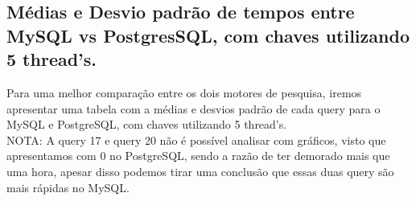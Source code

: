 \documentclass{article}
\begin{document}
  \subsection{Médias e Desvio padrão de tempos entre MySQL vs PostgresSQL, com chaves utilizando 5 thread's.}

  \texttt{}\par Para uma melhor comparação entre os dois motores de pesquisa, iremos apresentar uma tabela com a médias e desvios padrão de cada query para o MySQL e PostgreSQL, com chaves utilizando 5 thread's. \\
NOTA: A query 17 e query 20 não é possível analisar com gráficos, visto que apresentamos com 0 no PostgreSQL, sendo a razão de ter demorado mais que uma hora, apesar disso podemos tirar uma conclusão que essas duas query são mais rápidas no MySQL.
\end{document}
